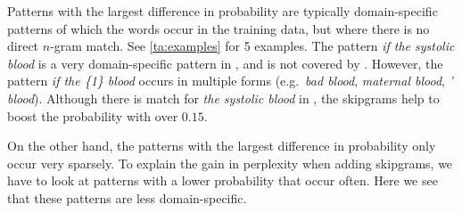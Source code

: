 

Patterns with the largest difference in probability are typically domain-specific patterns of which the words occur in the training data, but where there is no direct $n$-gram match. See \cref{ta:examples} for 5 examples. 
The pattern \emph{if the systolic blood} is a very domain-specific pattern in \emea, and is not covered by \obw. However, the pattern \emph{if the \{1\} blood} occurs in multiple forms (e.g.\ \emph{bad blood}, \emph{maternal blood}, \emph{' blood}). Although there is match for \emph{the systolic blood} in \obw, the skipgrams help to boost the probability with over $0.15$. 

On the other hand, the patterns with the largest difference in probability only occur very sparsely. To explain the gain in perplexity when adding skipgrams, we have to look at patterns with a lower probability that occur often. Here we see that these patterns are less domain-specific.
%

